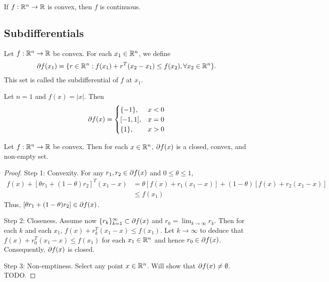 \begin{theorem}
If $f:\mathbb{R}^n \to \mathbb{R}$ is convex, then $f$ is continuous.
\end{theorem}

\subsection{Subdifferentials}

\begin{definition}[Subdifferential]
Let $f:\mathbb{R}^n \to \mathbb{R}$ be convex.
For each $x_1 \in \mathbb{R}^n$, we define
\begin{align}
\partial f(x_1) = \{ r \in \mathbb{R}^n : f(x_1) + r^T (x_2 - x_1) \le f(x_2), \forall x_2 \in \mathbb{R}^n \}.
\end{align}
This set is called the subdifferential of $f$ at $x_1$.
\end{definition}

\begin{example}
Let $n=1$ and $f(x) = |x|$.
Then
\begin{align}
\partial f(x) = 
\begin{cases}
\{ -1 \}, & x < 0 \\
[-1, 1], & x = 0 \\
\{ 1 \}, & x > 0 \\
\end{cases}
\end{align}
\end{example}

\begin{theorem}
Let $f:\mathbb{R}^n \to \mathbb{R}$ be convex.
Then for each $x \in \mathbb{R}^n$, $\partial f(x)$ is a closed, convex, and non-empty set.
\end{theorem}

\begin{proof}
Step 1:
Convexity.
For any $r_1, r_2 \in \partial f(x)$ and $0 \le \theta \le 1$, 
\begin{align}
f(x) + \left[ \theta r_1 + (1-\theta) r_2 \right]^T (x_1 - x) 
&= \theta \left[ f(x) + r_1 (x_1 - x) \right] + (1-\theta) \left[ f(x) + r_2 (x_1 - x) \right] \\
&\le f(x_1)
\end{align}
Thus, $\left[ \theta r_1 + (1-\theta) r_2 \right] \in \partial f(x)$.

Step 2:
Closeness. 
Assume now $\{r_k\}_{k=1}^{\infty} \subset \partial f(x)$ and $r_0 = \lim_{k \to \infty} r_k$.
Then for each $k$ and each $x_1$, $f(x) + r_k^T (x_1 - x) \le f(x_1)$.
Let $k \to \infty$ to deduce that $f(x) + r_0^T (x_1 - x) \le f(x_1)$ for each $x_1 \in \mathbb{R}^n$ and hence $r_0 \in \partial f(x)$.
Consequently, $\partial f(x)$ is closed.

Step 3:
Non-emptiness.
Select any point $x \in \mathbb{R}^n$. 
Will show that $\partial f(x) \neq \emptyset$.
TODO.

\end{proof}

